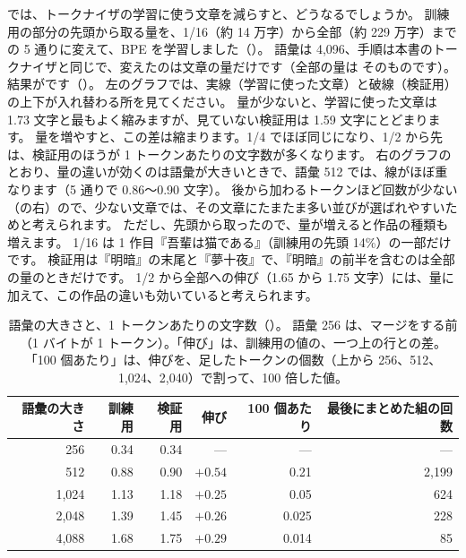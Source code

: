 では、トークナイザの学習に使う文章を減らすと、どうなるでしょうか。
訓練用の部分の先頭から取る量を、1/16（約 14 万字）から全部（約 229 万字）までの 5 通りに変えて、BPE を学習しました（）。
語彙は 4,096、手順は本書のトークナイザと同じで、変えたのは文章の量だけです（全部の量は  そのものです）。
結果がです（）。
左のグラフでは、実線（学習に使った文章）と破線（検証用）の上下が入れ替わる所を見てください。
量が少ないと、学習に使った文章は 1.73 文字と最もよく縮みますが、見ていない検証用は 1.59 文字にとどまります。
量を増やすと、この差は縮まります。1/4 でほぼ同じになり、1/2 から先は、検証用のほうが 1 トークンあたりの文字数が多くなります。
右のグラフのとおり、量の違いが効くのは語彙が大きいときで、語彙 512 では、線がほぼ重なります（5 通りで 0.86〜0.90 文字）。
後から加わるトークンほど回数が少ない（の右）ので、少ない文章では、その文章にたまたま多い並びが選ばれやすいためと考えられます。
ただし、先頭から取ったので、量が増えると作品の種類も増えます。
1/16 は 1 作目『吾輩は猫である』（訓練用の先頭 14\%）の一部だけです。
検証用は『明暗』の末尾と『夢十夜』で、『明暗』の前半を含むのは全部の量のときだけです。
1/2 から全部への伸び（1.65 から 1.75 文字）には、量に加えて、この作品の違いも効いていると考えられます。


\begin{table}[tbp]
\centering
\caption{語彙の大きさと、1 トークンあたりの文字数（）。
語彙 256 は、マージをする前（1 バイトが 1 トークン）。「伸び」は、訓練用の値の、一つ上の行との差。
「100 個あたり」は、伸びを、足したトークンの個数（上から 256、512、1,024、2,040）で割って、100 倍した値。}
\label{tab:tok-tradeoff}
\small
\begin{tabular}{rrrrrr}
\toprule
語彙の大きさ & 訓練用 & 検証用 & 伸び & 100 個あたり & 最後にまとめた組の回数 \\
\midrule
256 & 0.34 & 0.34 & — & — & — \\
512 & 0.88 & 0.90 & $+0.54$ & 0.21 & 2,199 \\
1,024 & 1.13 & 1.18 & $+0.25$ & 0.05 & 624 \\
2,048 & 1.39 & 1.45 & $+0.26$ & 0.025 & 228 \\
4,088 & 1.68 & 1.75 & $+0.29$ & 0.014 & 85 \\
\bottomrule
\end{tabular}
\end{table}

